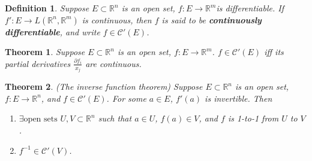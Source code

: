 \documentclass[aps,pra,onecolumn,notitlepage,superscriptaddress]{revtex4-1}
\newcommand{\R}{\mathbb{R}}
\newtheorem{theo}{Theorem}
\newtheorem{defi}{Definition}
\begin{document}
    \begin{defi}
        Suppose $E \subset \R^n$ is an open set, $f: E \to \R^m$is differentiable. If $f': E \to L(\R^n, \R^m)$ is continuous, then $f$ is said to be \textbf{continuously differentiable}, and write $f \in \mathscr{C}'(E)$.
    \end{defi}

    \begin{theo}
        Suppose $E \subset \R^n$ is an open set, $f: E \to \R^m$. $f \in \mathscr{C}'(E)$ iff its partial derivatives $\frac{\partial f_i}{x_j}$ are continuous.
    \end{theo}

    \begin{theo}
        (The inverse function theorem) Suppose $E \subset \R^n$ is an open set, $f: E \to \R^n$, and $f \in \mathscr{C}'(E)$. For some $a \in E$, $f'(a) $ is invertible. Then
        \begin{enumerate}
            \item $\exists \text{open sets }U,V \subset \R^n$ such that $a \in U$, $f(a) \in V$, and $f$ is 1-to-1 from $U$ to $V$. 

            \item $f^{-1} \in \mathscr{C}'(V)$.
        \end{enumerate} 
    \end{theo}
\end{document}
